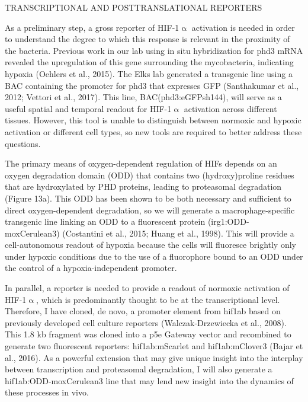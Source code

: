 TRANSCRIPTIONAL AND POSTTRANSLATIONAL REPORTERS

As a preliminary step, a gross reporter of HIF-1$\upalpha$ activation is needed in order to understand the degree to which this response is relevant in the proximity of the bacteria. Previous work in our lab using in situ hybridization for phd3 mRNA revealed the upregulation of this gene surrounding the mycobacteria, indicating hypoxia (Oehlers et al., 2015). The Elks lab generated a transgenic line using a BAC containing the promoter for phd3 that expresses GFP (Santhakumar et al., 2012; Vettori et al., 2017). This line, BAC(phd3:eGFPsh144), will serve as a useful spatial and temporal readout for HIF-1$\upalpha$ activation across different tissues. However, this tool is unable to distinguish between normoxic and hypoxic activation or different cell types, so new tools are required to better address these questions. 

The primary means of oxygen-dependent regulation of HIFs depends on an oxygen degradation domain (ODD) that contains two (hydroxy)proline residues that are hydroxylated by PHD proteins, leading to proteasomal degradation (Figure 13a). This ODD has been shown to be both necessary and sufficient to direct oxygen-dependent degradation, so we will generate a macrophage-specific transgenic line linking an ODD to a fluorescent protein (irg1:ODD-moxCerulean3) (Costantini et al., 2015; Huang et al., 1998). This will provide a cell-autonomous readout of hypoxia because the cells will fluoresce brightly only under hypoxic conditions due to the use of a fluorophore bound to an ODD under the control of a hypoxia-independent promoter.

In parallel, a reporter is needed to provide a readout of normoxic activation of HIF-1$\upalpha$, which is predominantly thought to be at the transcriptional level. Therefore, I have cloned, de novo, a promoter element from hif1ab based on previously developed cell culture reporters (Walczak-Drzewiecka et al., 2008). This 1.8 kb fragment was cloned into a p5e Gateway vector and recombined to generate two fluorescent reporters: hif1ab:mScarlet and hif1ab:mClover3 (Bajar et al., 2016). As a powerful extension that may give unique insight into the interplay between transcription and proteasomal degradation, I will also generate a hif1ab:ODD-moxCerulean3 line that may lend new insight into the dynamics of these processes in vivo. 

